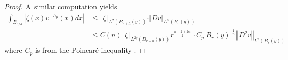 \documentclass[12pt,leqno]{amsart}%
\theoremstyle{plain}
\numberwithin{equation}{section}
\theoremstyle{definition}
\begin{document}
\begin{proof}
A\ similar computation yields
\begin{align}
\int_{B_{3/4}}\left\vert \zeta(x)v^{-h_{p}}(x)dx\right\vert  &  \leq\Vert
\zeta\Vert_{L^{2}(B_{r+h}(y))}\cdot\Vert Dv\Vert_{L^{2}(B_{r}(y))}\nonumber\\
&  \leq C(n)\Vert\zeta\Vert_{L^{2q}(B_{r+h}(y))}r^{\frac{n-2+2\alpha}{2}}\cdot
C_{p}|B_{r}(y)|^{\frac{1}{n}}\left\Vert D^{2}v\right\Vert _{L^{2}(B_{r}(y))}
\label{e310}%
\end{align}
where $C_{p}$ is from the Poincar\'{e} inequality \cite[(7.44)]{GT}.


\begin{comment}
Similarly
\begin{align}
\int_{B_{1/2}}\left|\zeta(x) v^{-h_{p}}(x)dx\right| &=\int_{B_{1/2}}\left|\zeta(x) \int_{0}%
^{1}\left(  -D_{p}v(x-th_{p})\right)\right|  dtdx\nonumber\\
&  \leq \int_{0}^{1}\int_{B_{1/2}}\left|\zeta(x) \left(  -D_{p}v(x-th_{p})\right)\right|
dxdt\nonumber\\
&  \leq\int_{0}^{1}\left\Vert \zeta \right\Vert _{L^{2n/(n+2)}(B_{1}%
)}\left\Vert Dv\right\Vert _{L^{2n/(n-2)}(B_{1/2})}dt\nonumber\\
&  =\left\Vert \zeta \right\Vert _{L^{2n/(n+2)}(B_{1})}\left\Vert
Dv\right\Vert _{L^{2n/(n-2)}(B_{r}(y))}\nonumber\\
&  \leq\left(  \int_{B_{r}}|\zeta|^{\frac{2n}{n+2}q}dx)\right)  ^{\frac
{1}{q}}r^{\frac{n-2+2\alpha}{2}}\left\Vert Dv\right\Vert _{L^{2n/(n-2)}(B_{r}(y))}\nonumber\\
&  \leq\left(  \int_{B_{r}(y)}|\zeta|^{\frac{2n}{n+2}q}dx)\right)^{\frac
{1}{q}}r^{\frac{n-2+2\alpha}{2}}C_{s}\left\Vert D^{2}v\right\Vert
_{L^{2}(B_{r}(y))}\label{e310}%
\end{align}
where $C_{s}$ is from the Sobolev inequality.
\end{comment}


\medskip


\end{proof}
\end{document}
